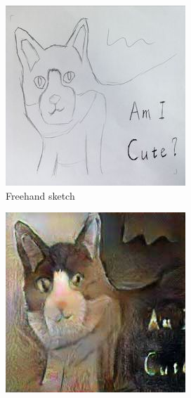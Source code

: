 \documentclass[10pt,twocolumn,letterpaper]{article}
\begin{document}
\begin{figure}[!h]
\begin{subfigure}[b]{0.16\textwidth}
  \includegraphics[width=\textwidth]{figure/realdraw/src.jpg}
  \caption{Freehand sketch}
  \label{fig::freehand}
\end{subfigure}
%
\begin{subfigure}[b]{0.16\textwidth}
  \includegraphics[width=\textwidth]{figure/realdraw/pix2pix.jpg}

\end{subfigure}
\end{figure}
\end{document}
